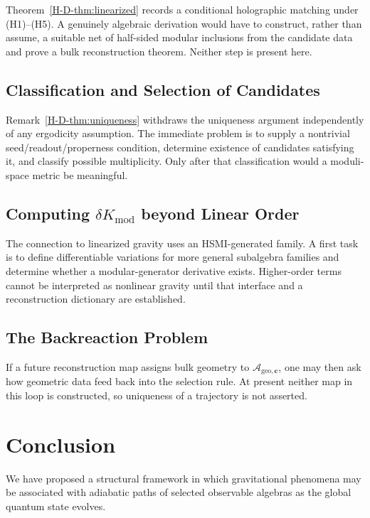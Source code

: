 \documentclass[12pt,a4paper,openany]{book}
\begin{document}
Theorem~\ref{H-D-thm:linearized} records a conditional holographic matching under (H1)--(H5). A genuinely algebraic derivation would have to construct, rather than assume, a suitable net of half-sided modular inclusions from the candidate data and prove a bulk reconstruction theorem.  Neither step is present here.

\subsection{Classification and Selection of Candidates}

Remark~\ref{H-D-thm:uniqueness} withdraws the uniqueness argument independently of any ergodicity assumption.  The immediate problem is to supply a nontrivial seed/readout/properness condition, determine existence of candidates satisfying it, and classify possible multiplicity.  Only after that classification would a moduli-space metric be meaningful.

\subsection{Computing $\delta K_{\mathrm{mod}}$ beyond Linear Order}

The connection to linearized gravity uses an HSMI-generated family.  A first task is to define differentiable variations for more general subalgebra families and determine whether a modular-generator derivative exists.  Higher-order terms cannot be interpreted as nonlinear gravity until that interface and a reconstruction dictionary are established.

\subsection{The Backreaction Problem}

If a future reconstruction map assigns bulk geometry to $\mathcal{A}_{\mathrm{geo},\mathbf{c}}$, one may then ask how geometric data feed back into the selection rule.  At present neither map in this loop is constructed, so uniqueness of a trajectory is not asserted.

\section{Conclusion}
\label{H-D-sec:conclusion}

We have proposed a structural framework in which gravitational phenomena may be associated with adiabatic paths of selected observable algebras as the global quantum state evolves.
\end{document}
